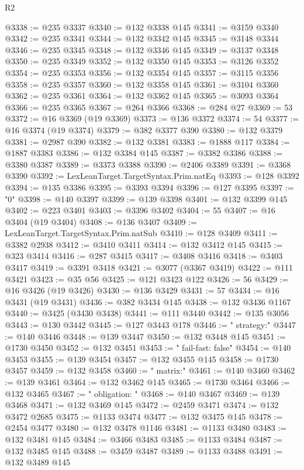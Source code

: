 \begin{lexlean}{R2}
\begin{coremodule}
@3338 := @235 @3337
@3340 := @132 @3338 @145
@3341 := @3159 @3340
@3342 := @235 @3341
@3344 := @132 @3342 @145
@3345 := @3148 @3344
@3346 := @235 @3345
@3348 := @132 @3346 @145
@3349 := @3137 @3348
@3350 := @235 @3349
@3352 := @132 @3350 @145
@3353 := @3126 @3352
@3354 := @235 @3353
@3356 := @132 @3354 @145
@3357 := @3115 @3356
@3358 := @235 @3357
@3360 := @132 @3358 @145
@3361 := @3104 @3360
@3362 := @235 @3361
@3364 := @132 @3362 @145
@3365 := @3093 @3364
@3366 := @235 @3365
@3367 := @264 @3366
@3368 := @284 @27
@3369 := 53
@3372 := @16 @3369 (@19 @3369)
@3373 := @136 @3372
@3374 := 54
@3377 := @16 @3374 (@19 @3374)
@3379 := @382 @3377 @390
@3380 := @132 @3379
@3381 := @2987 @390
@3382 := @132 @3381
@3383 := @1888 @117
@3384 := @1887 @3383
@3386 := @132 @3384 @145
@3387 := @3382 @3386
@3388 := @3380 @3387
@3389 := @3373 @3388
@3390 := @2406 @3389
@3391 := @3368 @3390
@3392 := LexLeanTarget.TargetSyntax.Prim.natEq
@3393 := @128 @3392
@3394 := @135 @3386
@3395 := @3393 @3394
@3396 := @127 @3395
@3397 := "0"
@3398 := @140 @3397
@3399 := @139 @3398
@3401 := @132 @3399 @145
@3402 := @223 @3401
@3403 := @3396 @3402
@3404 := 55
@3407 := @16 @3404 (@19 @3404)
@3408 := @136 @3407
@3409 := LexLeanTarget.TargetSyntax.Prim.natSub
@3410 := @128 @3409
@3411 := @3382 @2938
@3412 := @3410 @3411
@3414 := @132 @3412 @145
@3415 := @323 @3414
@3416 := @287 @3415
@3417 := @3408 @3416
@3418 := @3403 @3417
@3419 := @3391 @3418
@3421 := @3077 (@3367 @3419)
@3422 := @111 @3421
@3423 := @35 @56
@3425 := @121 @3423 @122
@3426 := 56
@3429 := @16 @3426 (@19 @3426)
@3430 := @136 @3429
@3431 := 57
@3434 := @16 @3431 (@19 @3431)
@3436 := @382 @3434 @145
@3438 := @132 @3436 @1167
@3440 := @3425 (@3430 @3438)
@3441 := @111 @3440
@3442 := @135 @3056
@3443 := @130 @3442
@3445 := @127 @3443 @178
@3446 := "    strategy:"
@3447 := @140 @3446
@3448 := @139 @3447
@3450 := @132 @3448 @145
@3451 := @1730 @3450
@3452 := @132 @3451
@3453 := "      fail-fast: false"
@3454 := @140 @3453
@3455 := @139 @3454
@3457 := @132 @3455 @145
@3458 := @1730 @3457
@3459 := @132 @3458
@3460 := "      matrix:"
@3461 := @140 @3460
@3462 := @139 @3461
@3464 := @132 @3462 @145
@3465 := @1730 @3464
@3466 := @132 @3465
@3467 := "        obligation: "
@3468 := @140 @3467
@3469 := @139 @3468
@3471 := @132 @3469 @145
@3472 := @2459 @3471
@3474 := @132 @3472 @2685
@3475 := @1133 @3474
@3477 := @132 @3475 @145
@3478 := @2454 @3477
@3480 := @132 @3478 @1146
@3481 := @1133 @3480
@3483 := @132 @3481 @145
@3484 := @3466 @3483
@3485 := @1133 @3484
@3487 := @132 @3485 @145
@3488 := @3459 @3487
@3489 := @1133 @3488
@3491 := @132 @3489 @145

\end{coremodule}
\end{lexlean}
